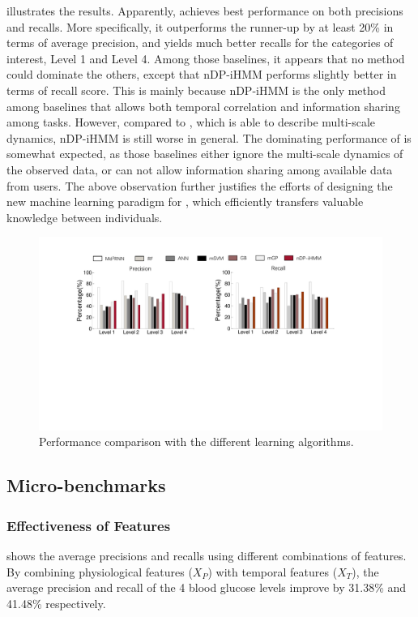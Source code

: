 { illustrates the results.
Apparently, \modelname achieves best performance on both precisions and recalls.
More specifically, it outperforms the runner-up by at least 20\% in terms of average precision, and yields much better recalls for the categories of interest, \ie Level 1 and Level 4.
Among those baselines, it appears that no method could dominate the others, except that nDP-iHMM performs slightly better in terms of recall score.
This is mainly because nDP-iHMM is the only method among baselines that allows both temporal correlation and information sharing among tasks.
However, compared to \modelname, which is able to describe multi-scale dynamics, nDP-iHMM is still worse in general.
The dominating performance of \modelname is somewhat expected, as those baselines either ignore the multi-scale dynamics of the observed data, or can not allow information sharing among available data from users.
The above observation further justifies the efforts of designing the new machine learning paradigm for \sysname, which efficiently transfers valuable knowledge between individuals.
}

\begin{figure}[h]
  \centering
  \includegraphics[width=0.8\columnwidth]{./img/Model_CMP1.pdf}
  \caption{Performance comparison with the different learning algorithms.}
  \label{fig:cmp_models}
\end{figure}

\subsection{Micro-benchmarks}
\subsubsection{Effectiveness of Features}
 shows the average precisions and recalls using different combinations of features.
By combining physiological features ($X_{P}$) with temporal features ($X_{T}$), the average precision and recall of the 4 blood glucose levels improve by 31.38\% and 41.48\% respectively.

